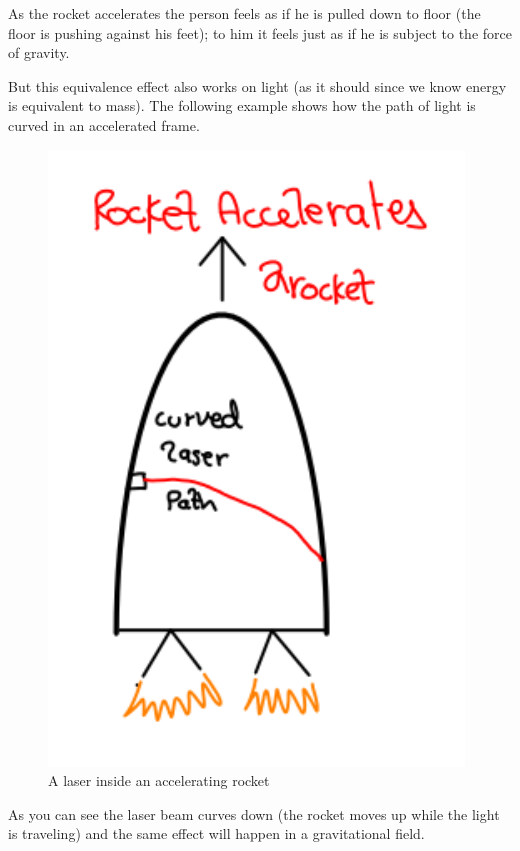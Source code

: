 \documentclass[12pt, letterpaper]{article}
\begin{document}
    As the rocket accelerates the person feels as if he is pulled 
    down to floor (the floor is pushing against his feet); to him it feels 
    just as if he is subject to the force of gravity. 
    
    But this equivalence effect also works on light (as it should since we know 
    energy is equivalent to mass). The following example shows how the path 
    of light is curved in an accelerated frame.
  
    \begin{figure}[h!]
        \caption{A laser inside an accelerating rocket}
        \centering
        \includegraphics[scale=0.5]{rocket_accelerates_light.pdf}
    \end{figure}  
    
    As you can see the laser beam curves down (the rocket moves up while 
    the light is traveling) and the same effect will happen in a 
    gravitational field.
 
\end{document}
